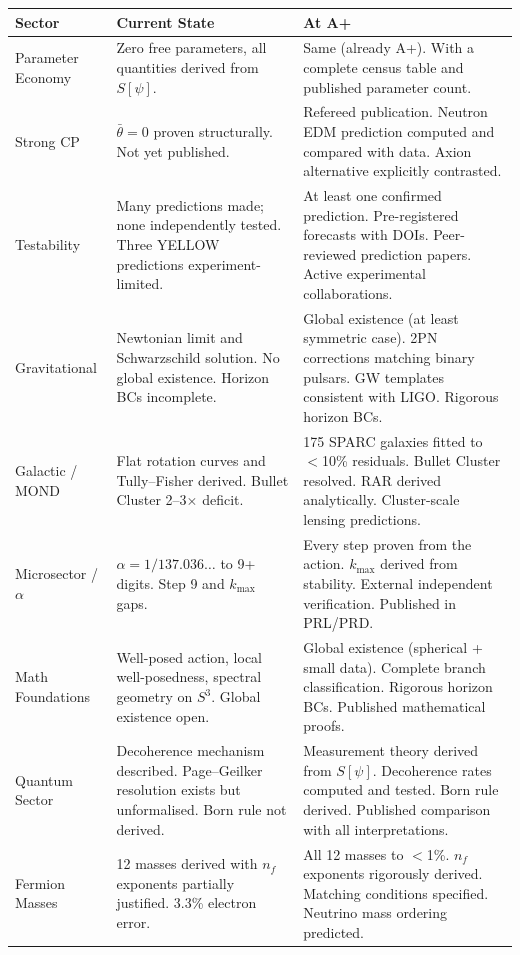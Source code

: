 \documentclass[11pt,a4paper]{article}
\begin{document}
\begin{longtable}{p{3.5cm}p{5cm}p{5cm}}
\toprule
\textbf{Sector} & \textbf{Current State} & \textbf{At A+} \\
\midrule
\endhead
Parameter Economy &
Zero free parameters, all quantities derived from $S[\psi]$. &
Same (already A+). With a complete census table and published parameter count. \\
\midrule
Strong CP &
$\bar{\theta}=0$ proven structurally. Not yet published. &
Refereed publication. Neutron EDM prediction computed and compared with data. Axion alternative explicitly contrasted. \\
\midrule
Testability &
Many predictions made; none independently tested. Three YELLOW predictions experiment-limited. &
At least one confirmed prediction. Pre-registered forecasts with DOIs. Peer-reviewed prediction papers. Active experimental collaborations. \\
\midrule
Gravitational &
Newtonian limit and Schwarzschild solution. No global existence. Horizon BCs incomplete. &
Global existence (at least symmetric case). 2PN corrections matching binary pulsars. GW templates consistent with LIGO. Rigorous horizon BCs. \\
\midrule
Galactic / MOND &
Flat rotation curves and Tully--Fisher derived. Bullet Cluster 2--3$\times$ deficit. &
175 SPARC galaxies fitted to $<$10\% residuals. Bullet Cluster resolved. RAR derived analytically. Cluster-scale lensing predictions. \\
\midrule
Microsector / $\alpha$ &
$\alpha = 1/137.036\ldots$ to 9+ digits. Step 9 and $k_{\max}$ gaps. &
Every step proven from the action. $k_{\max}$ derived from stability. External independent verification. Published in PRL/PRD. \\
\midrule
Math Foundations &
Well-posed action, local well-posedness, spectral geometry on $S^3$. Global existence open. &
Global existence (spherical + small data). Complete branch classification. Rigorous horizon BCs. Published mathematical proofs. \\
\midrule
Quantum Sector &
Decoherence mechanism described. Page--Geilker resolution exists but unformalised. Born rule not derived. &
Measurement theory derived from $S[\psi]$. Decoherence rates computed and tested. Born rule derived. Published comparison with all interpretations. \\
\midrule
Fermion Masses &
12 masses derived with $n_f$ exponents partially justified. 3.3\% electron error. &
All 12 masses to $<$1\%. $n_f$ exponents rigorously derived. Matching conditions specified. Neutrino mass ordering predicted. \\

\end{longtable}
\end{document}
